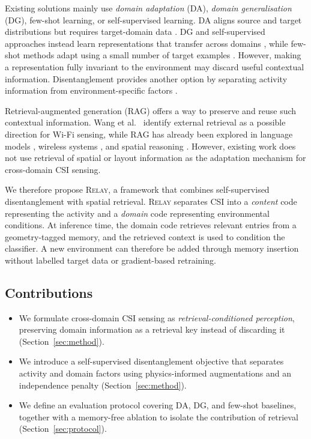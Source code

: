 \documentclass[conference]{IEEEtran}
\newcommand{\method}{\textsc{Relay}}
\begin{document}
Existing solutions mainly use \emph{domain adaptation} (DA), \emph{domain
generalisation} (DG), few-shot learning, or self-supervised learning. DA aligns source and
target distributions but requires target-domain data
\cite{Chen2022Fidora,Prasad2024DANN}. DG and
self-supervised approaches instead learn representations that transfer across domains
\cite{Liu2024WiSR,Liu2024WiSGP,Wang2022AirFi,Xu2023ARCFi,Yang2022AutoFi,
Barahimi2024CPC,Lyons2024WiFiAct}, while few-shot methods adapt using a small number of
target examples \cite{Yin2022FewSense,Zhao2024CrossFi,Yang2023FewCS}. However, making a
representation fully invariant to the environment may discard useful contextual
information. Disentanglement provides another option by separating activity information
from environment-specific factors \cite{Kang2021ContextAware}.

Retrieval-augmented generation (RAG) offers a way to preserve and reuse such contextual
information. Wang et al.\ \cite{Wang2025GeneralizabilitySurvey} identify external
retrieval as a possible direction for Wi-Fi sensing, while RAG has already been explored
in language models \cite{lewis2020rag}, wireless systems
\cite{Nazar2024Enwar,Nazar2026Enwar2,wi_chat}, and spatial reasoning
\cite{spatial_rag}. However, existing work does not use retrieval of spatial or layout
information as the adaptation mechanism for cross-domain CSI sensing.

We therefore propose \method{}, a framework that combines self-supervised
disentanglement with spatial retrieval. \method{} separates CSI into a \emph{content}
code representing the activity and a \emph{domain} code representing environmental
conditions. At inference time, the domain code retrieves relevant entries from a
geometry-tagged memory, and the retrieved context is used to condition the classifier.
A new environment can therefore be added through memory insertion without labelled
target data or gradient-based retraining.

\subsection*{Contributions}
\begin{itemize}
\item We formulate cross-domain CSI sensing as \emph{retrieval-conditioned perception},
preserving domain information as a retrieval key instead of discarding it
(Section~\ref{sec:method}).
\item We introduce a self-supervised disentanglement objective that separates activity
and domain factors using physics-informed augmentations and an independence penalty
(Section~\ref{sec:method}).
\item We define an evaluation protocol covering DA, DG, and few-shot baselines, together
with a memory-free ablation to isolate the contribution of retrieval
(Section~\ref{sec:protocol}).
\end{itemize}
\end{document}
